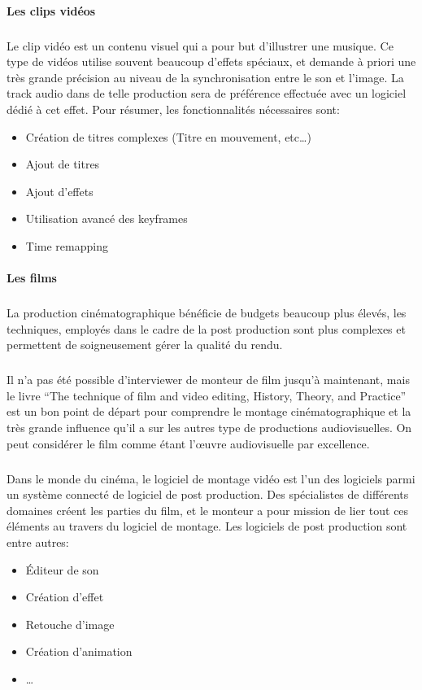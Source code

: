 \paragraph {Les clips vidéos}
\subparagraph{}
Le clip vidéo est un contenu visuel qui a pour but d'illustrer
une musique. Ce type de vidéos utilise souvent beaucoup d'effets spéciaux, et demande à
priori une très grande précision au niveau de la synchronisation
entre le son et l'image. La track audio dans de telle production
sera de préférence effectuée avec un logiciel dédié à cet
effet. Pour résumer, les fonctionnalités nécessaires sont:
\begin{itemize}
  \item{Création de titres complexes (Titre en mouvement, etc\ldots)}
  \item{Ajout de titres}
  \item{Ajout d'effets}
  \item{Utilisation avancé des keyframes}
  \item{Time remapping}
\end{itemize}

\paragraph {Les films}
\subparagraph{}
La production cinématographique bénéficie de budgets beaucoup plus élevés, les techniques,
employés dans le cadre de la post production sont plus complexes et permettent de soigneusement
gérer la qualité du rendu.

\subparagraph{}
Il n'a pas été possible d'interviewer de monteur de film jusqu'à maintenant, mais
le livre ``The technique of film and video editing, History, Theory, and Practice''
\cite{TheTechniqueOfFilmAndVideoEditing} est un bon point de départ pour
comprendre le montage cinématographique et la très grande influence qu'il a
sur les autres type de productions audiovisuelles. On peut considérer le film comme
étant l'œuvre audiovisuelle par excellence. %

\subparagraph{}
Dans le monde du cinéma, le logiciel de montage vidéo est l'un des logiciels
parmi un système connecté de logiciel de post production. Des spécialistes de
différents domaines créent les parties du film, et le monteur a pour mission
de lier tout ces éléments au travers du logiciel de montage. Les logiciels
de post production sont entre autres:
\begin{itemize}
  \item{Éditeur de son}
  \item{Création d'effet}
  \item{Retouche d'image}
  \item{Création d'animation}
  \item{\ldots}
\end{itemize}


